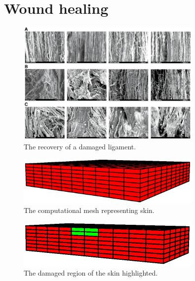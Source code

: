 \section{Wound healing}
\label{wound-healing}


\begin{figure}[!hpt]
\centering
\includegraphics[width=0.8\textwidth]
                {images/experiments/healing-damaged-ligament} 
\caption{The recovery of a damaged ligament.}
\label{healing-damaged-ligament}
\end{figure}

\begin{figure}[!hpt]
\centering
\includegraphics[width=0.8\textwidth]
                {images/examples/lagrangian/healing/full-skin-mesh} 
\caption{The computational mesh representing skin.}
\label{healing-skin-mesh}
\end{figure}

\begin{figure}[!hpt]
\centering
\includegraphics[width=0.8\textwidth]
                {images/examples/lagrangian/healing/damaged-region} 
\caption{The damaged region of the skin highlighted.}
\label{healing-damaged-region}
\end{figure}


